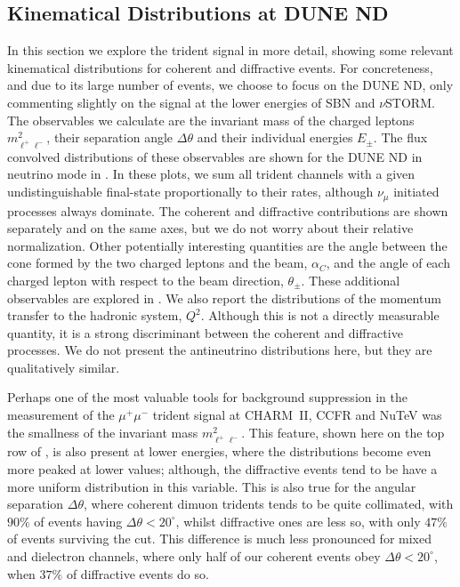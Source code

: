 \graphicspath{{}{appendices/figs/}{appendices/}}
\subsection{Kinematical Distributions at DUNE ND}
%
\label{subsec:kine}

In this section we explore the trident signal in more detail, showing some relevant kinematical distributions for coherent and diffractive events. For concreteness, and due to its large number of events, we choose to focus on the DUNE ND, only commenting slightly on the signal at the lower energies of SBN and $\nu$STORM. The observables we calculate are the invariant mass of the charged leptons $m^2_{\ell^+ \ell^-}$, their separation angle $\Delta \theta$ and their individual energies $E_\pm$. The flux convolved distributions of these observables are shown for the DUNE ND in neutrino mode in . In these plots, we sum all trident channels with a given undistinguishable final-state proportionally to their rates, although $\nu_\mu$ initiated processes always dominate. The coherent and diffractive contributions are shown separately and on the same axes, but we do not worry about their relative normalization. Other potentially interesting quantities are the angle between the cone formed by the two charged leptons and the beam, $\alpha_C$, and the angle of each charged lepton with respect to the beam direction, $\theta_\pm$.  These additional observables are explored in . We also report the distributions of the momentum transfer to the hadronic system, $Q^2$. Although this is not a directly measurable quantity, it is a strong discriminant between the coherent and diffractive processes. We do not present the antineutrino distributions here, but they are qualitatively similar.

Perhaps one of the most valuable tools for background suppression in the measurement of the $\mu^+\mu^-$ trident signal at CHARM~II, CCFR and NuTeV \cite{Geiregat:1990gz,Mishra:1991bv,Adams:1998yf} was the smallness of the invariant mass $m^2_{\ell^+ \ell^-}$. This feature, shown here on the top row of , is also present at lower energies, where the distributions become even more peaked at lower values; although, the diffractive events tend to be have a more uniform distribution in this variable. This is also true for the angular separation $\Delta \theta$, where coherent dimuon tridents tends to be quite collimated, with $90\%$ of events having $\Delta \theta < 20^\circ$, whilst diffractive ones are less so, with only $47\%$ of events surviving the cut. This difference is much less pronounced for mixed and dielectron channels, where only half of our coherent events obey $\Delta \theta < 20^\circ$, when $37\%$ of diffractive events do so.

